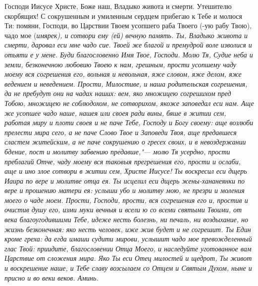 Господи Иисусе Христе, Боже наш, Владыко живота и смерти. Утешителю скорбящих! С сокрушенным и умиленным сердцем прибегаю к Тебе и молюся Ти: помяни, Господи, во Царствии Твоем усопшего раба Твоего (-ую рабу Твою), чадо мое (\itshape имярек\normalfont{}), и сотвори ему (ей) вечную память. Ты, Владыко живота и смерти, даровал еси мне чадо сие. Твоей же благой и премудрой воле изволися и отьяти е у мене. Буди благословенно Имя Твое, Господи. Молю Тя, Судие неба и земли, безконечною любовию Твоею к нам, грешным, прости усопшему чаду моему вся согрешения его, вольная и невольная, яже словом, яже делом, яже ведением и неведением. Прости, Милостиве, и наша родительская согрешения, да не пребудут они на чадах наших: вем, яко множицею согрешихом пред Тобою, множицею не соблюдохом, не сотворихом, якоже заповедал еси нам. Аще же усопшее чадо наше, нашея или своея ради вины, бяше в житии сем, работая миру и плоти своея и не паче Тебе, Господу и Богу своему: аще возлюби прелести мира сего, а не паче Слово Твое и Заповеди Твоя, аще предавшеся сластем житейским, а не паче сокрушению о гресех своих, и в невоздержании бдение, пост и молитву забвению предавше,"--- молю Тя усердно, прости преблагий Отче, чаду моему вся таковыя прегрешения его, прости и ослаби, аще и ино злое сотвори в житии сем, Христе Иисусе! Ты воскресил еси дщерь Иаира по вере и молитве отца ея. Ты исцелил еси дщерь жены-хананеянки по вере и прошению матери ея: услыши убо и молитву мою, не презри и моления моего о чаде моем. Прости, Господи, прости, вся согрешения его и, простив и очистив душу его, изми муки вечныя и всели ю со всеми святыми Твоими, от века благоугодившими Тебе, идеже несть болезнь, ни печаль, ни воздыхание, но жизнь безконечная: яко несть человек, иже жив будет и не согрешит. Ты Един кроме греха: да егда имаши судити мирови, услышит чадо мое превожделенный глас Твой: приидите, благословении Отца Моего, и наследуйте уготованное вам Царствие от сложения мира. Яко Ты еси Отец милостей и щедрот, Ты живот и воскрешение наше, и Тебе славу возсылаем со Отцем и Святым Духом, ныне и присно и во веки веков. Аминь. 



\mychapterending

 


